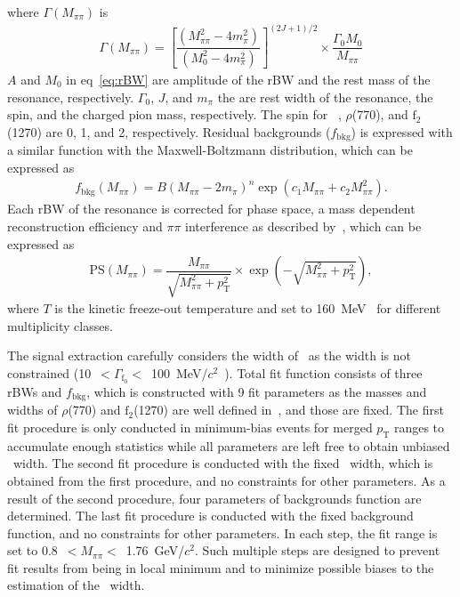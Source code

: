 where $\Gamma(M_{\pi\pi})$ is
\begin{eqnarray}
\Gamma(M_{\pi\pi}) = \left[ \dfrac{ (M_{\pi\pi}^{2} - 4m_{\pi}^{2}) }{ (M_{0}^{2}-4m_{\pi}^{2}) } \right]^{(2J+1)/2} \times \dfrac{\Gamma_{0}M_{0}}{M_{\pi\pi}}
\label{eq:rBWW}
\end{eqnarray}
$A$ and $M_{0}$ in eq~\ref{eq:rBW} are amplitude of the rBW and  the rest mass of the resonance, respectively. $\Gamma_{0}$, $J$, and $m_{\pi}$ the are rest width of the resonance, the spin, and the charged pion mass, respectively. The spin for \fzero~, $\rho$(770), and $\mathrm{f}_{2}$(1270) are 0, 1, and 2, respectively. Residual backgrounds ($f_{\mathrm{bkg}}$) is expressed with a similar function with the Maxwell-Boltzmann distribution, which can be expressed as~\cite{OPAL:1998enc}
\begin{eqnarray}
f_{\mathrm{bkg}}(M_{\pi\pi}) = B(M_{\pi\pi}-2m_{\pi})^{n}\exp{(c_{1}M_{\pi\pi} + c_{2}M_{\pi\pi}^{2})}.
\label{eq:bkg}
\end{eqnarray} 
Each rBW of the resonance is corrected for phase space, a mass dependent reconstruction efficiency and $\pi\pi$ interference as described by~\cite{Rapp:2003ar}, which can be expressed as
\begin{eqnarray}
\mathrm{PS}(M_{\pi\pi}) = \dfrac{M_{\pi\pi}}{\sqrt{M_{\pi\pi}^{2}+p_{\mathrm{T}}^{2}}}\times\exp{(-\sqrt{M_{\pi\pi}^{2}+p_{\mathrm{T}}^{2}})},
\label{eq:ps}
\end{eqnarray} 
where $T$ is the kinetic freeze-out temperature and set to 160~MeV~\cite{ALICE:2013wgn} for different multiplicity classes.

The signal extraction carefully considers the width of \fzero~as the width is not constrained (10~$<\Gamma_{\mathrm{f}_{0}}<$~100~MeV/$c^{2}$~\cite{ParticleDataGroup:2020ssz}). Total fit function consists of three rBWs and $f_{\mathrm{bkg}}$, which is constructed with 9 fit parameters as the masses and widths of $\rho$(770) and $\mathrm{f}_{2}$(1270) are well defined in~\cite{ParticleDataGroup:2020ssz}, and those are fixed. The first fit procedure is only conducted in minimum-bias events for merged $p_{\mathrm{T}}$ ranges to accumulate enough statistics while all parameters are left free to obtain unbiased \fzero~width. The second fit procedure is conducted with the fixed \fzero~width, which is obtained from the first procedure, and no constraints for other parameters. As a result of the second procedure, four parameters of backgrounds function are determined. The last fit procedure is conducted with the fixed background function, and no constraints for other parameters. In each step, the fit range is set to 0.8~$<M_{\pi\pi}<$~1.76~GeV/$c^{2}$. Such multiple steps are designed to prevent fit results from being in local minimum and to minimize possible biases to the estimation of the \fzero~width. 

